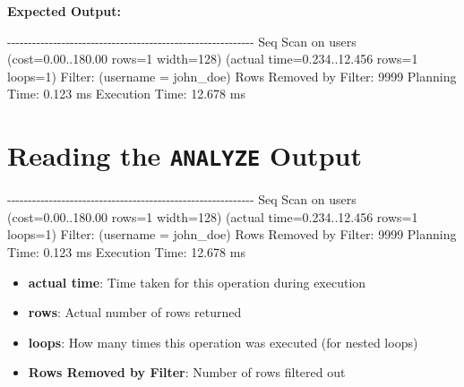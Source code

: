 \documentclass[
]{report}
\newenvironment{Shaded}{\begin{snugshade}}{\end{snugshade}}
\newcommand{\NormalTok}[1]{\textcolor[rgb]{0.00,0.23,0.31}{#1}}
\providecommand{\tightlist}{%
  \setlength{\itemsep}{0pt}\setlength{\parskip}{0pt}}\usepackage{longtable,booktabs,array}
\begin{document}
\textbf{Expected Output:}

\begin{Shaded}
\begin{Highlighting}[]
\NormalTok{{-}{-}{-}{-}{-}{-}{-}{-}{-}{-}{-}{-}{-}{-}{-}{-}{-}{-}{-}{-}{-}{-}{-}{-}{-}{-}{-}{-}{-}{-}{-}{-}{-}{-}{-}{-}{-}{-}{-}{-}{-}{-}{-}{-}{-}{-}{-}{-}{-}{-}{-}{-}{-}{-}{-}{-}{-}{-}{-}}
\NormalTok{  Seq Scan on users  (cost=0.00..180.00 rows=1 width=128) }
\NormalTok{                    (actual time=0.234..12.456 rows=1 loops=1)}
\NormalTok{    Filter: (username = \textquotesingle{}john\_doe\textquotesingle{})}
\NormalTok{    Rows Removed by Filter: 9999}
\NormalTok{Planning Time: 0.123 ms}
\NormalTok{Execution Time: 12.678 ms}
\end{Highlighting}
\end{Shaded}

\section{\texorpdfstring{Reading the \texttt{ANALYZE}
Output}{Reading the ANALYZE Output}}\label{reading-the-analyze-output}

\begin{Shaded}
\begin{Highlighting}[]
\NormalTok{{-}{-}{-}{-}{-}{-}{-}{-}{-}{-}{-}{-}{-}{-}{-}{-}{-}{-}{-}{-}{-}{-}{-}{-}{-}{-}{-}{-}{-}{-}{-}{-}{-}{-}{-}{-}{-}{-}{-}{-}{-}{-}{-}{-}{-}{-}{-}{-}{-}{-}{-}{-}{-}{-}{-}{-}{-}{-}{-}}
\NormalTok{  Seq Scan on users  (cost=0.00..180.00 rows=1 width=128)}
\NormalTok{                    (actual time=0.234..12.456 rows=1 loops=1)}
\NormalTok{    Filter: (username = \textquotesingle{}john\_doe\textquotesingle{})}
\NormalTok{    Rows Removed by Filter: 9999}
\NormalTok{Planning Time: 0.123 ms}
\NormalTok{Execution Time: 12.678 ms}
\end{Highlighting}
\end{Shaded}

\begin{itemize}
\tightlist
\item
  \textbf{actual time}: Time taken for this operation during execution
\item
  \textbf{rows}: Actual number of rows returned
\item
  \textbf{loops}: How many times this operation was executed (for nested
  loops)
\item
  \textbf{Rows Removed by Filter}: Number of rows filtered out
\end{itemize}
\end{document}
